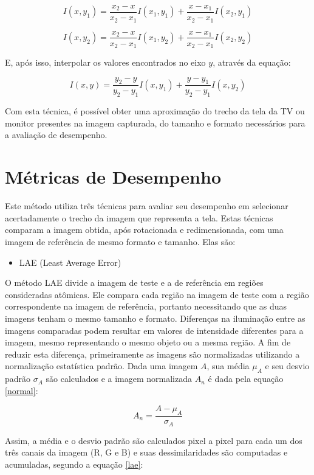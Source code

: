 $$ I(x,y_1) = \frac{x_2-x}{x_2-x_1}I(x_1,y_1) + \frac{x-x_1}{x_2-x_1}I(x_2,y_1) $$

$$ I(x,y_2) = \frac{x_2-x}{x_2-x_1}I(x_1,y_2) + \frac{x-x_1}{x_2-x_1}I(x_2,y_2) $$


E, após isso, interpolar os valores encontrados no eixo $y$, através da equação:

$$ I(x,y) = \frac{y_2-y}{y_2-y_1}I(x,y_1) + \frac{y-y_1}{y_2-y_1}I(x,y_2)$$

Com esta técnica, é possível obter uma aproximação do trecho da tela da TV ou monitor presentes na imagem capturada, do tamanho e formato necessários para a avaliação de desempenho.

\section{Métricas de Desempenho}

Este método utiliza três técnicas para avaliar seu desempenho em selecionar acertadamente o trecho da imagem que representa a tela. Estas técnicas comparam a imagem obtida, após rotacionada e redimensionada, com uma imagem de referência de mesmo formato e tamanho. Elas são:
\begin{itemize}
\item LAE (Least Average Error)
\end{itemize}




O método LAE divide a imagem de teste e a de referência em regiões consideradas atômicas. Ele compara cada região na imagem de teste com a região correspondente na imagem de referência, portanto necessitando que as duas imagens tenham o mesmo tamanho e formato. Diferenças na iluminação entre as imagens comparadas podem resultar em valores de intensidade diferentes para a imagem, mesmo representando o mesmo objeto ou a mesma região. A fim de reduzir esta diferença, primeiramente as imagens são normalizadas utilizando a normalização estatística padrão. Dada uma imagem $A$, sua média $\mu_A$ e seu desvio padrão $\sigma_A$ são calculados e a imagem normalizada $A_n$ é dada pela equação \ref{normal}:

\begin{equation}
A_n = \frac{A-\mu_A}{\sigma_A} \label{normal}
\end{equation}

Assim, a média e o desvio padrão são calculados pixel a pixel para cada um dos três canais da imagem (R, G e B) e suas dessimilaridades são computadas e acumuladas, segundo a equação \ref{lae}:

